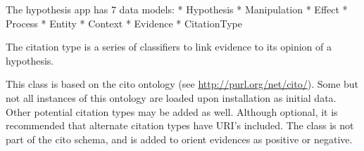 \documentclass[letterpaper,10pt,english]{sphinxmanual}
\begin{document}
The hypothesis app has 7 data models:
* Hypothesis
* Manipulation
* Effect
* Process
* Entity
* Context
* Evidence 
* CitationType


\begin{fulllineitems}
\label{api:experimentdb.hypotheses.models.CitationType}
The citation type is a series of classifiers to link evidence to its opinion of a hypothesis.


This class is based on the cito ontology (see \href{http://purl.org/net/cito/}{http://purl.org/net/cito/}).  Some but not all instances of this ontology are loaded upon installation as initial data.  Other potential citation types may be added as well.  Although optional, it is recommended that alternate citation types have URI's included.  The class is not part of the cito schema, and is added to orient evidences as positive or negative.


\begin{fulllineitems}
\label{api:experimentdb.hypotheses.models.CitationType.DoesNotExist}
\end{fulllineitems}


\begin{fulllineitems}
\label{api:experimentdb.hypotheses.models.CitationType.MultipleObjectsReturned}
\end{fulllineitems}


\begin{fulllineitems}
\label{api:experimentdb.hypotheses.models.CitationType.evidence_set}
\end{fulllineitems}


\begin{fulllineitems}
\label{api:experimentdb.hypotheses.models.CitationType.get_group_display}
\end{fulllineitems}


\end{fulllineitems}
\end{document}
